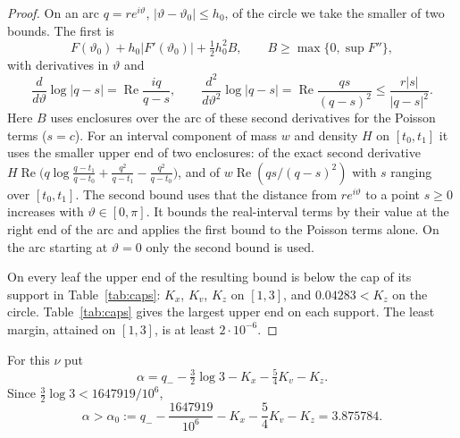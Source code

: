 \documentclass{amsart}
\numberwithin{equation}{section}
\numberwithin{table}{section}
\newcommand{\Kzcirc}{0.04283}
\newcommand{\alphazero}{3.875784}
\newcommand{\capmargin}{2\cdot10^{-6}}
\begin{document}
\begin{proof}
On an arc $q=re^{i\vartheta}$, $|\vartheta-\vartheta_0|\le h_0$, of the
circle we take the smaller of two bounds. The first is
\[
 F(\vartheta_0)+h_0|F'(\vartheta_0)|+\tfrac12h_0^2B,\qquad
 B\ge\max\{0,\sup F''\},
\]
with derivatives in $\vartheta$ and
\[
 \frac{d}{d\vartheta}\log|q-s|=\operatorname{Re}\frac{iq}{q-s},\qquad
 \frac{d^2}{d\vartheta^2}\log|q-s|=\operatorname{Re}\frac{qs}{(q-s)^2}
 \le\frac{r|s|}{|q-s|^2}.
\]
Here $B$ uses enclosures over the arc of these second derivatives for the
Poisson terms ($s=c$). For an interval component of mass $w$ and density
$H$ on $[t_0,t_1]$ it uses the smaller upper end of two enclosures: of the
exact second derivative
$H\operatorname{Re}\bigl(q\log\frac{q-t_1}{q-t_0}+\frac{q^2}{q-t_1}-\frac{q^2}{q-t_0}\bigr)$,
and of $w\operatorname{Re}(qs/(q-s)^2)$
with $s$ ranging over $[t_0,t_1]$. The second bound uses that the distance from $re^{i\vartheta}$
to a point $s\ge0$ increases with $\vartheta\in[0,\pi]$. It bounds the
real-interval terms by their value at the right end of the arc and applies
the first bound to the Poisson terms alone. On the arc starting at
$\vartheta=0$ only the second bound is used.

On every leaf the upper end of the resulting bound is below the cap of its
support in Table~\ref{tab:caps}: $K_x$, $K_v$, $K_z$ on $[1,3]$, and
$\Kzcirc<K_z$ on the circle. Table~\ref{tab:caps} gives the largest upper
end on each support. The least margin, attained on $[1,3]$, is at least
$\capmargin$.
\end{proof}

For this $\nu$ put
\begin{equation}\label{eq:alpha}
 \alpha=q_--\tfrac32\log3-K_x-\tfrac54K_v-K_z.
\end{equation}
Since $\frac32\log3<1647919/10^6$,
\[
 \alpha>\alpha_0:=q_--\frac{1647919}{10^6}-K_x-\frac54K_v-K_z=\alphazero.
\]
\end{document}
